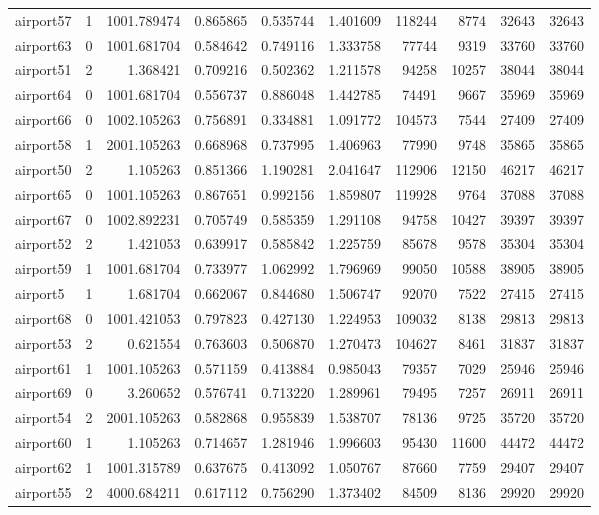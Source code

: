 \begin{longtable}{|l|r|r|r|r|r|r|r|r|r|}
airport57 & 1 & 1001.789474 & 0.865865 & 0.535744 & 1.401609 & 118244 & 8774 & 32643 & 32643 \\
airport63 & 0 & 1001.681704 & 0.584642 & 0.749116 & 1.333758 & 77744 & 9319 & 33760 & 33760 \\
airport51 & 2 & 1.368421 & 0.709216 & 0.502362 & 1.211578 & 94258 & 10257 & 38044 & 38044 \\
airport64 & 0 & 1001.681704 & 0.556737 & 0.886048 & 1.442785 & 74491 & 9667 & 35969 & 35969 \\
airport66 & 0 & 1002.105263 & 0.756891 & 0.334881 & 1.091772 & 104573 & 7544 & 27409 & 27409 \\
airport58 & 1 & 2001.105263 & 0.668968 & 0.737995 & 1.406963 & 77990 & 9748 & 35865 & 35865 \\
airport50 & 2 & 1.105263 & 0.851366 & 1.190281 & 2.041647 & 112906 & 12150 & 46217 & 46217 \\
airport65 & 0 & 1001.105263 & 0.867651 & 0.992156 & 1.859807 & 119928 & 9764 & 37088 & 37088 \\
airport67 & 0 & 1002.892231 & 0.705749 & 0.585359 & 1.291108 & 94758 & 10427 & 39397 & 39397 \\
airport52 & 2 & 1.421053 & 0.639917 & 0.585842 & 1.225759 & 85678 & 9578 & 35304 & 35304 \\
airport59 & 1 & 1001.681704 & 0.733977 & 1.062992 & 1.796969 & 99050 & 10588 & 38905 & 38905 \\
airport5 & 1 & 1.681704 & 0.662067 & 0.844680 & 1.506747 & 92070 & 7522 & 27415 & 27415 \\
airport68 & 0 & 1001.421053 & 0.797823 & 0.427130 & 1.224953 & 109032 & 8138 & 29813 & 29813 \\
airport53 & 2 & 0.621554 & 0.763603 & 0.506870 & 1.270473 & 104627 & 8461 & 31837 & 31837 \\
airport61 & 1 & 1001.105263 & 0.571159 & 0.413884 & 0.985043 & 79357 & 7029 & 25946 & 25946 \\
airport69 & 0 & 3.260652 & 0.576741 & 0.713220 & 1.289961 & 79495 & 7257 & 26911 & 26911 \\
airport54 & 2 & 2001.105263 & 0.582868 & 0.955839 & 1.538707 & 78136 & 9725 & 35720 & 35720 \\
airport60 & 1 & 1.105263 & 0.714657 & 1.281946 & 1.996603 & 95430 & 11600 & 44472 & 44472 \\
airport62 & 1 & 1001.315789 & 0.637675 & 0.413092 & 1.050767 & 87660 & 7759 & 29407 & 29407 \\
airport55 & 2 & 4000.684211 & 0.617112 & 0.756290 & 1.373402 & 84509 & 8136 & 29920 & 29920 \\

\end{longtable}
